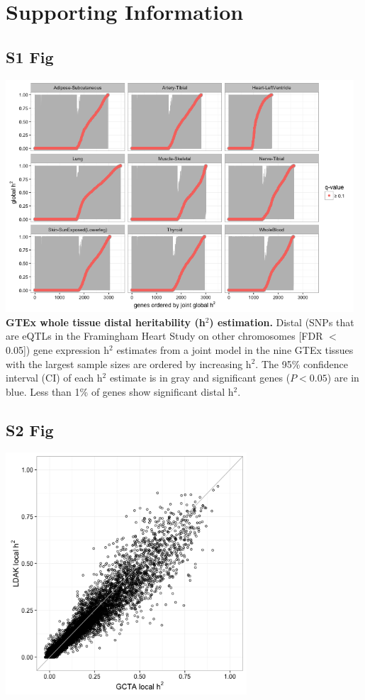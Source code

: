 \documentclass[10pt,letterpaper]{article}
\begin{document}


\section*{Supporting Information}

\begin{singlespace}



\subsection*{S1 Fig}
\includegraphics[width=13cm]{Figures/Fig-GTEx_TW_glo_jt_h2.png}
\label{S1_Fig}
{\bf GTEx whole tissue distal heritability (h$^2$) estimation.} Distal (SNPs that are eQTLs in the Framingham Heart Study on other chromosomes [FDR $<$ 0.05]) gene expression h$^2$ estimates from a joint model in the nine GTEx tissues with the largest sample sizes are ordered by increasing h$^2$. The 95\% confidence interval (CI) of each h$^2$ estimate is in gray and significant genes ($P<0.05$) are in blue. Less than 1\% of genes show significant distal h$^2$.

\subsection*{S2 Fig}
\includegraphics[width=9cm]{Figures/Fig-LDAK-gcta-no-cons.png}
\label{S2_Fig}


\end{singlespace}
\end{document}

